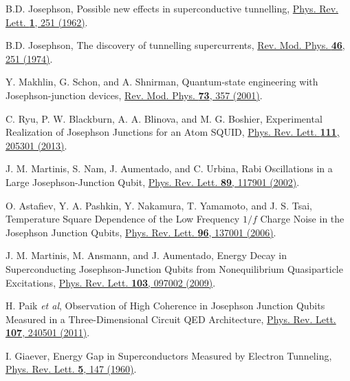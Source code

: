 \documentclass[twocolumn,prl,floatfix,citeautoscript,nofootinbib,superscriptaddress]{revtex4}
\begin{document}
\begin{thebibliography}{99}
 B.D. Josephson, {Possible new effects in
superconductive tunnelling}, \href{https://doi.org/10.1016/0031-9163(62)91369-0}%
{Phys. Rev. Lett. \textbf{1}, 251 (1962)}.

 B.D. Josephson, {The discovery of tunnelling
supercurrents}, \href{https://doi.org/10.1103/RevModPhys.46.251}{Rev. Mod.
Phys. \textbf{46}, 251 (1974)}.


 Y. Makhlin, G. Schon, and A. Shnirman, {Quantum-state
engineering with Josephson-junction devices}, \href{https://doi.org/10.1103/RevModPhys.73.357}%
{Rev. Mod. Phys. \textbf{73}, 357 (2001)}.

 C. Ryu, P. W. Blackburn, A. A. Blinova, and M. G. Boshier,
{Experimental Realization of Josephson Junctions for an Atom SQUID}, \href{https://doi.org/10.1103/PhysRevLett.111.205301}%
{Phys. Rev. Lett. \textbf{111}, 205301 (2013)}.



 J. M. Martinis, S. Nam, J. Aumentado, and C. Urbina, {%
Rabi Oscillations in a Large Josephson-Junction Qubit}, \href{https://doi.org/10.1103/PhysRevLett.89.117901}%
{Phys. Rev. Lett. \textbf{89}, 117901 (2002)}.

 O. Astafiev, Y. A. Pashkin, Y. Nakamura, T. Yamamoto,
and J. S. Tsai, {Temperature Square Dependence of the Low Frequency $1/f$
Charge Noise in the Josephson Junction Qubits}, \href{https://doi.org/10.1103/PhysRevLett.96.137001}%
{Phys. Rev. Lett. \textbf{96}, 137001 (2006)}.

 J. M. Martinis, M. Ansmann, and J. Aumentado, {Energy
Decay in Superconducting Josephson-Junction Qubits from Nonequilibrium
Quasiparticle Excitations}, \href{https://doi.org/10.1103/PhysRevLett.103.097002}%
{Phys. Rev. Lett. \textbf{103}, 097002 (2009)}.

 H. Paik \textit{et al}, {Observation of High Coherence in
Josephson Junction Qubits Measured in a Three-Dimensional Circuit QED
Architecture}, \href{https://doi.org/10.1103/PhysRevLett.107.240501}{Phys.
Rev. Lett. \textbf{107}, 240501 (2011)}. %

 I. Giaever, {Energy Gap in Superconductors Measured by
Electron Tunneling}, \href{https://doi.org/10.1103/PhysRevLett.5.147}{Phys.
Rev. Lett. \textbf{5}, 147 (1960)}.


\end{thebibliography}
\end{document}
